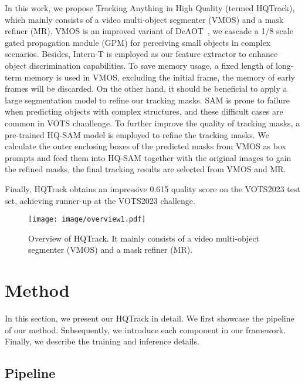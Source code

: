 \documentclass[10pt,twocolumn,letterpaper]{article}
\begin{document}
In this work, we propose Tracking Anything in High Quality (termed HQTrack), which mainly consists of a video multi-object segmenter (VMOS) and a mask refiner (MR). VMOS is an improved variant of DeAOT~\cite{deaot}, we cascade a 1/8 scale gated propagation module (GPM) for perceiving small objects in complex scenarios. Besides, Intern-T\cite{internimage} is employed as our feature extractor to enhance object discrimination capabilities.
To save memory usage, a fixed length of long-term memory is used in VMOS, excluding the initial frame, the memory of early frames will be discarded.
On the other hand, it should be beneficial to apply a large segmentation model to refine our tracking masks.
SAM\cite{sam} is prone to failure when predicting objects with complex structures\cite{sam_hq}, and these difficult cases are common in VOTS chanllenge.
To further improve the quality of tracking masks, a pre-trained HQ-SAM\cite{sam_hq} model is employed to refine  the tracking masks. 
We calculate the outer enclosing boxes of the predicted masks from VMOS as box prompts and feed them into HQ-SAM together with the original images to gain the refined masks, the final tracking results are selected from VMOS and MR.

Finally, HQTrack obtains an impressive 0.615 quality score on the VOTS2023 test set, achieving runner-up at the VOTS2023 challenge.
	
	
	
	 
\begin{figure*}[ht]
    \vspace{-2mm}
        \centering
        \texttt{[image: image/overview1.pdf]}
        \vspace{-1.5mm}
        \caption{Overview of HQTrack. It mainly consists of a video multi-object segmenter (VMOS) and a mask refiner (MR).}
        \label{fig:method_overview}
    \vspace{-2mm}
\end{figure*}


\section{Method}
In this section,  we present our HQTrack in detail. 
We first showcase the pipeline of our method. Subsequently, we introduce each component in our framework. Finally, we describe the training and inference details. 

\subsection{Pipeline}
\label{sec:pipline}
\end{document}
